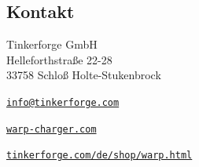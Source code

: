 \documentclass[a4paper,10pt]{article}
\begin{document}
\begin{multicols*}{2}
    \newpage

    \section{Kontakt}
    Tinkerforge GmbH\\ Helleforthstraße 22-28\\ 33758 Schloß Holte-Stukenbrock
    \begin{description}[leftmargin=!,labelwidth=\widthof{\textbf{Website}}]
        \item[E-Mail] \href{mailto:info@tinkerforge.com}{\texttt{info@tinkerforge.com}}
        \item[Website] \href{https://warp-charger.com}{\texttt{warp-charger.com}}
        \item[Telefon] 
        \item[Shop] \href{https://tinkerforge.com/de/shop/warp.html}{\texttt{tinkerforge.com/de/shop/warp.html}}
    \end{description}


\end{multicols*}
\end{document}
